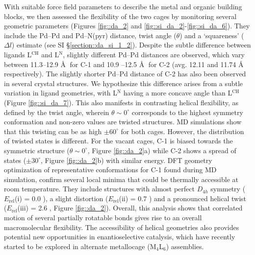 \documentclass[../../main.tex]{subfiles}
\begin{document}
With suitable force field parameters to describe the metal and organic building blocks, we then assessed the flexibility of the two cages by monitoring several geometric parameters (Figures \ref{fig::da_2} and \ref{fig::si_da_2}-\ref{fig::si_da_6}). They include the Pd–Pd and Pd–N(pyr) distance, twist angle ($\theta$) and a `squareness’ ($\Delta l$) estimate (see SI §\ref{section::da_si_1_2}). Despite the subtle difference between ligands L$^\text{CH}$ and L$^\text{N}$, slightly different Pd--Pd distances are observed, which vary between 11.3--12.9 \AA$\;$ for C-1 and 10.9 –12.5 \AA$\;$ for C-2 (avg. 12.11 and 11.74 \AA$\;$ respectively). The slightly shorter Pd--Pd distance of C-2 has also been observed in several crystal structures. We hypothesize this difference arises from a subtle variation in ligand geometries, with L${}^\text{N}$ having a more concave angle than L$^\text{CH}$ (Figure \ref{fig::si_da_7}). This also manifests in contrasting helical flexibility, as defined by the twist angle, wherein $\theta \sim0^\circ$ corresponds to the highest symmetry conformation and non-zero values are twisted structures. MD simulations show that this twisting can be as high $\pm60^\circ$ for both cages. However, the distribution of twisted states is different. For the vacant cages, C-1 is biased towards the symmetric structure ($\theta \sim0^\circ$, Figure \ref{fig::da_2}a) while C-2 shows a spread of states ($\pm30^\circ$, Figure \ref{fig::da_2}b) with similar energy. DFT geometry optimization of representative conformations for C-1 found during MD simulation, confirm several local minima that could be thermally accessible at room temperature. They include structures with almost perfect $D_{4h}$ symmetry ($E_\text{rel}$(i) = 0.0 \kcal), a slight distortion ($E_\text{rel}$(ii) = 0.7 \kcal) and a pronounced helical twist ($E_\text{rel}$(iii) = 2.6 \kcal, Figure \ref{fig::da_2}). Overall, this analysis shows that correlated motion of several partially rotatable bonds gives rise to an overall macromolecular flexibility. The accessibility of helical geometries also provides potential new opportunities in enantioselective catalysis, which have recently started to be explored in alternate metallocage (M$_4$L$_6$) assemblies.\cite{Zhao2013} 
\end{document}

